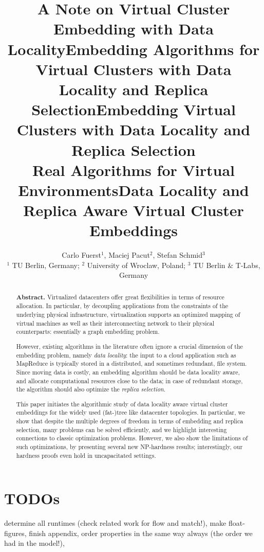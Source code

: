 \documentclass[9pt,twocolumn]{scrartcl}
\title{A Note on Virtual Cluster Embedding with Data Locality}
\title{Embedding Algorithms for Virtual Clusters with Data Locality and Replica Selection}
\title{Embedding Virtual Clusters with Data Locality and Replica Selection\\{\Large Real Algorithms for Virtual Environments}}
\title{Data Locality and Replica Aware Virtual Cluster Embeddings}
\author{Carlo Fuerst$^1$, Maciej Pacut$^2$, Stefan Schmid$^3$\\
{\small $^1$ TU Berlin, Germany; $^2$ University of Wroclaw, Poland; $^3$ TU Berlin \& T-Labs, Germany}}
\begin{document}
\maketitle


\begin{abstract}
\textbf{Abstract.} Virtualized datacenters offer great flexibilities in terms of resource allocation. In particular, by
decoupling applications from the constraints of the underlying physical infrastructure, virtualization
supports an optimized mapping of virtual machines as well as their interconnecting network
to their
physical counterparts: essentially a graph embedding problem.

However, existing algorithms
in the literature often ignore a crucial dimension of the embedding problem, namely \emph{data locality}:
the input to a cloud application such as MapReduce is typically stored in a distributed,
and sometimes redundant, file system. Since moving
data is costly, an embedding algorithm should be data locality aware,
and allocate computational resources close to the data; in case of redundant storage, the algorithm should also optimize the \emph{replica selection}.

This paper initiates the algorithmic study of data locality aware virtual cluster embeddings for
the widely used (fat-)tree like datacenter topologies.
In particular, we
show that
despite the multiple degrees of freedom in terms of embedding and replica selection,
many problems can be
solved efficiently, and we highlight interesting connections
to classic optimization problems. However, we also show the limitations of such optimizations,
by presenting several new NP-hardness results; interestingly,
our hardness proofs even hold in uncapacitated settings.
\end{abstract}

\section*{TODOs}

determine all runtimes (check related work for flow and match!), make float-figures, finish appendix, order properties in the same way always (the order we had in the model!),
\end{document}
